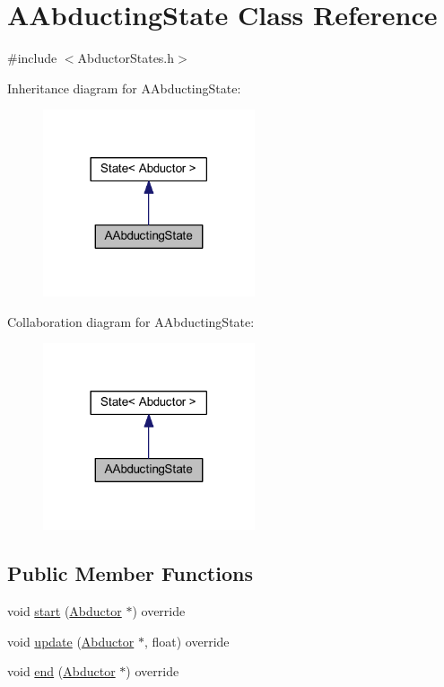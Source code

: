 \hypertarget{class_a_abducting_state}{}\section{A\+Abducting\+State Class Reference}
\label{class_a_abducting_state}


{\ttfamily \#include $<$Abductor\+States.\+h$>$}



Inheritance diagram for A\+Abducting\+State\+:\nopagebreak
\begin{figure}[H]
\begin{center}
\leavevmode
\includegraphics[width=177pt]{class_a_abducting_state__inherit__graph}
\end{center}
\end{figure}


Collaboration diagram for A\+Abducting\+State\+:\nopagebreak
\begin{figure}[H]
\begin{center}
\leavevmode
\includegraphics[width=177pt]{class_a_abducting_state__coll__graph}
\end{center}
\end{figure}
\subsection*{Public Member Functions}
\begin{DoxyCompactItemize}
\item 
void \hyperlink{class_a_abducting_state_a4a592efc0ae90b3c88de9cb676ed8357}{start} (\hyperlink{class_abductor}{Abductor} $\ast$) override
\item 
void \hyperlink{class_a_abducting_state_a37963b87c9c9fea8cfc8252618a53c98}{update} (\hyperlink{class_abductor}{Abductor} $\ast$, float) override
\item 
void \hyperlink{class_a_abducting_state_a618a6c11d2dc823b11161ff3a0c88ef8}{end} (\hyperlink{class_abductor}{Abductor} $\ast$) override
\end{DoxyCompactItemize}

